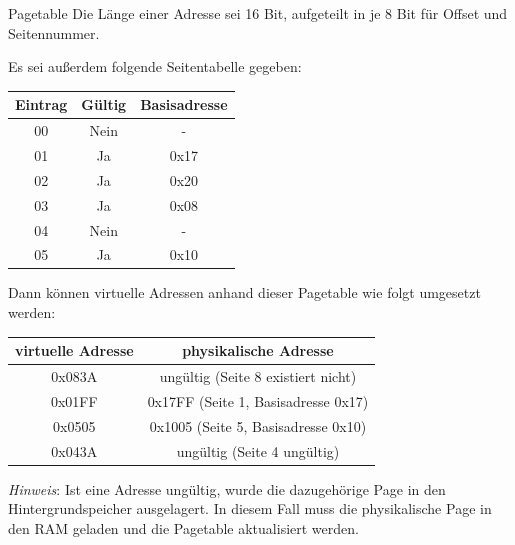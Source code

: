 \documentclass[german]{spicker}
\begin{document}
\begin{example}{Pagetable}
    Die Länge einer Adresse sei 16 Bit, aufgeteilt in je 8 Bit für Offset und Seitennummer.

    Es sei außerdem folgende Seitentabelle gegeben:

    \begin{center}
        \begin{tabular}{|c|c|c|}
            \hline
            \textbf{Eintrag} & \textbf{Gültig} & \textbf{Basisadresse} \\
            \hline
            00               & Nein            & -                     \\
            01               & Ja              & 0x17                  \\
            02               & Ja              & 0x20                  \\
            03               & Ja              & 0x08                  \\
            04               & Nein            & -                     \\
            05               & Ja              & 0x10                  \\
            \hline
        \end{tabular}
    \end{center}

    Dann können virtuelle Adressen anhand dieser Pagetable wie folgt umgesetzt werden:

    \begin{center}
        \begin{tabular}{|c|c|}
            \hline
            \textbf{virtuelle Adresse} & \textbf{physikalische Adresse}      \\
            \hline
            0x083A                     & ungültig (Seite 8 existiert nicht)  \\
            0x01FF                     & 0x17FF (Seite 1, Basisadresse 0x17) \\
            0x0505                     & 0x1005 (Seite 5, Basisadresse 0x10) \\
            0x043A                     & ungültig (Seite 4 ungültig)         \\
            \hline
        \end{tabular}
    \end{center}

    \emph{Hinweis}: Ist eine Adresse ungültig, wurde die dazugehörige Page in den Hintergrundspeicher ausgelagert. In diesem Fall muss die physikalische Page in den RAM geladen und die Pagetable aktualisiert werden.
\end{example}
\end{document}

